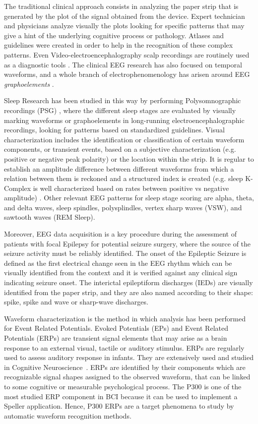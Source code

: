 \documentclass[brainsci,article,submit,moreauthors,pdftex,10pt,a4paper]{mdpi}
\begin{document}
The traditional clinical approach consists in analyzing the paper strip that is generated by the plot of the signal obtained from the device.  Expert technician and physicians analyze visually the plots looking for specific patterns that may give a hint of the underlying cognitive process or pathology.   Atlases and guidelines were created in order to help in the recognition of these complex patterns.   Even Video-electroencephalography scalp recordings are routinely used as a diagnostic tools \citep{Giagante2003} .  The clinical EEG research has also focused on temporal waveforms, and a whole branch of electrophenomenology has arisen around EEG \textit{graphoelements} \citep{Schomer2010}.  

Sleep Research has been studied in this way by performing Polysomnographic recordings (PSG)  \citep{Rodenbeck2006}, where the different sleep stages are evaluated by visually marking waveforms or graphoelements in long-running electroencephalographic recordings, looking for patterns based on standardized guidelines.   Visual characterization includes the identification or classification of certain waveform components, or transient events, based on a subjective characterization (e.g. positive or negative peak polarity) or the location within the strip.  It is regular to establish an amplitude difference between different waveforms from which a relation between them is reckoned and a structured index is created (e.g. sleep K-Complex is well characterized based on rates between positive vs negative amplitude) \citep{Uchida1999}.  Other relevant EEG patterns for sleep stage scoring are alpha, theta, and delta waves,  sleep spindles, polysplindles, vertex sharp waves (VSW), and sawtooth waves (REM Sleep).

Moreover, EEG data acquisition is a key procedure during the assessment of patients with focal Epilepsy for potential seizure surgery, where the source of the seizure activity must be reliably identified. The onset of the Epileptic Seizure is defined as the first electrical change seen in the EEG rhythm which can be visually identified from the context and it is verified against any clinical sign indicating seizure onset.  The interictal epileptiform discharges (IEDs) are visually identified from the paper strip, and they are also named according to their shape: spike, spike and wave or sharp-wave discharges\citep{EEGIntro}.  

Waveform characterization is the method in which analysis has been performed for Event Related Potentials.  Evoked Potentials (EPs) and Event Related Potentials (ERPs) are transient signal elements that may arise as a brain response to an external visual, tactile or auditory stimulus.  ERPs are regularly used to assess auditory response in infants.  They are extensively used and studied in Cognitive Neuroscience~\citep{Luck2005}.  ERPs are identified by their components which are recognizable signal shapes assigned to the observed waveform, that can be linked to some cognitive or measurable psychological process.   The P300 is one of the most studied ERP component in BCI because it can be used to implement a Speller application.  Hence, P300 ERPs are a target phenomena to study by automatic waveform recognition methods.
\end{document}
